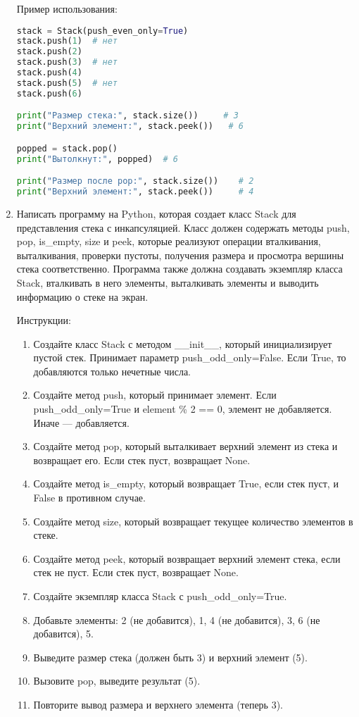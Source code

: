 \begin{enumerate}
Пример использования:
\begin{lstlisting}[language=Python]
stack = Stack(push_even_only=True)
stack.push(1)  # нет
stack.push(2)
stack.push(3)  # нет
stack.push(4)
stack.push(5)  # нет
stack.push(6)

print("Размер стека:", stack.size())     # 3
print("Верхний элемент:", stack.peek())   # 6

popped = stack.pop()
print("Вытолкнут:", popped)  # 6

print("Размер после pop:", stack.size())    # 2
print("Верхний элемент:", stack.peek())     # 4
\end{lstlisting}

\item Написать программу на Python, которая создает класс Stack для представления стека с инкапсуляцией. Класс должен содержать методы push, pop, is\_empty, size и peek, которые реализуют операции вталкивания, выталкивания, проверки пустоты, получения размера и просмотра вершины стека соответственно. Программа также должна создавать экземпляр класса Stack, вталкивать в него элементы, выталкивать элементы и выводить информацию о стеке на экран.

Инструкции:
\begin{enumerate}
    \item Создайте класс Stack с методом \_\_init\_\_, который инициализирует пустой стек. Принимает параметр push\_odd\_only=False. Если True, то добавляются только нечетные числа.
    \item Создайте метод push, который принимает элемент. Если push\_odd\_only=True и element \% 2 == 0, элемент не добавляется. Иначе — добавляется.
    \item Создайте метод pop, который выталкивает верхний элемент из стека и возвращает его. Если стек пуст, возвращает None.
    \item Создайте метод is\_empty, который возвращает True, если стек пуст, и False в противном случае.
    \item Создайте метод size, который возвращает текущее количество элементов в стеке.
    \item Создайте метод peek, который возвращает верхний элемент стека, если стек не пуст. Если стек пуст, возвращает None.
    \item Создайте экземпляр класса Stack с push\_odd\_only=True.
    \item Добавьте элементы: 2 (не добавится), 1, 4 (не добавится), 3, 6 (не добавится), 5.
    \item Выведите размер стека (должен быть 3) и верхний элемент (5).
    \item Вызовите pop, выведите результат (5).
    \item Повторите вывод размера и верхнего элемента (теперь 3).
\end{enumerate}


\end{enumerate}
